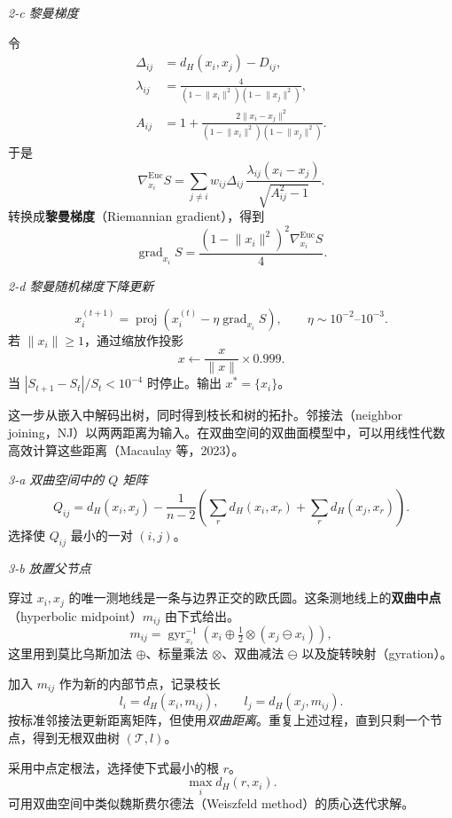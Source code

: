 \emph{2-c \quad 黎曼梯度}

令
\[
  \begin{aligned}
    \Delta_{ij}&=d_H(x_i,x_j)-D_{ij},\\
    \lambda_{ij}&=\frac{4}{(1-\lVert x_i\rVert^2)(1-\lVert x_j\rVert^2)},\\
    A_{ij}&=1+\frac{2\lVert x_i-x_j\rVert^2}
                     {(1-\lVert x_i\rVert^2)(1-\lVert x_j\rVert^2)}.
  \end{aligned}
\]
于是
\[
  \nabla^{\mathrm{Euc}}_{x_i}S
    =\sum_{j\neq i}w_{ij}\Delta_{ij}\,
        \frac{\lambda_{ij}(x_i-x_j)}{\sqrt{A_{ij}^2-1}}.
\]
转换成\textbf{黎曼梯度}（Riemannian gradient），得到
\[
  \operatorname{grad}_{x_i}S
  =\frac{(1-\lVert x_i\rVert^2)^2\nabla^{\mathrm{Euc}}_{x_i}S}{4}.
\]

\emph{2-d \quad 黎曼随机梯度下降更新}

\[
  x_i^{(t+1)}=\operatorname{proj}\!\left(x_i^{(t)}
      -\eta\operatorname{grad}_{x_i}S\right),
  \qquad \eta\sim 10^{-2}\text{–}10^{-3}.
\]
若 $\lVert x_i\rVert\geq1$，通过缩放作投影
\[
  x\leftarrow\frac{x}{\lVert x\rVert}\times0.999.
\]
当 $|S_{t+1}-S_t|/S_t<10^{-4}$ 时停止。输出 $x^*=\{x_i\}$。

这一步从嵌入中解码出树，同时得到枝长和树的拓扑。邻接法（neighbor joining，NJ）以两两距离为输入。在双曲空间的双曲面模型中，可以用线性代数高效计算这些距离（Macaulay 等，2023）。

\emph{3-a \quad 双曲空间中的 $Q$ 矩阵}
\[
  Q_{ij}=d_H(x_i,x_j)-\frac{1}{n-2}\left(\sum_r d_H(x_i,x_r)+\sum_r d_H(x_j,x_r)\right).
\]
选择使 $Q_{ij}$ 最小的一对 $(i,j)$。

\emph{3-b \quad 放置父节点}

穿过 $x_i,x_j$ 的唯一测地线是一条与边界正交的欧氏圆。这条测地线上的\textbf{双曲中点}（hyperbolic midpoint）$m_{ij}$ 由下式给出。
\[
  m_{ij}=\operatorname{gyr}_{x_i}^{-1}\!\left(
       x_i\oplus\tfrac12\otimes(x_j\ominus x_i)\right),
\]
这里用到莫比乌斯加法 $\oplus$、标量乘法 $\otimes$、双曲减法 $\ominus$ 以及旋转映射（gyration）。

加入 $m_{ij}$ 作为新的内部节点，记录枝长
\[
  l_i=d_H(x_i,m_{ij}),\qquad l_j=d_H(x_j,m_{ij}).
\]
按标准邻接法更新距离矩阵，但使用\emph{双曲距离}。重复上述过程，直到只剩一个节点，得到无根双曲树 $(\mathcal T,l)$。

采用中点定根法，选择使下式最小的根 $r$。
\[
  \max_i d_H(r,x_i).
\]
可用双曲空间中类似魏斯费尔德法（Weiszfeld method）的质心迭代求解。

